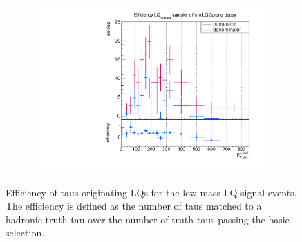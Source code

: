 \begin{figure}
\begin{subfigure}[t]{0.49\textwidth}
                \label{DividedfromLQ:signal:1prongLQ75}
                \end{subfigure}
                \begin{subfigure}[t]{0.49\textwidth}
                \includegraphics[width=\textwidth]{figures/plots/LQ75/Divided_fromLQ3prong.pdf}
                \label{DividedfromLQ:signal:3prong}
                \end{subfigure}
\caption[Efficiency of taus originating LQs for the low mass LQ signal events.]{Efficiency of taus originating LQs for the low mass LQ signal events. The efficiency is defined as the number of taus matched to a hadronic truth tau over the number of truth taus passing the basic selection.}
\label{DividedFromLQ:signal:LQ75}
\end{figure}
%
%
